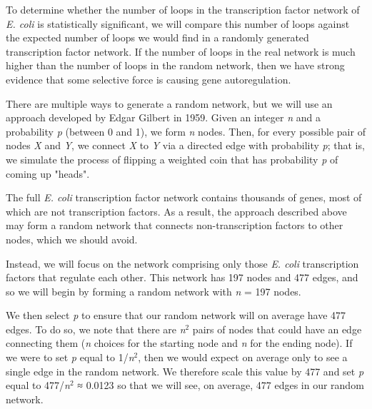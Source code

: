 To determine whether the number of loops in the transcription factor network of \textit{E. coli} is statistically significant, we will compare this number of loops against the expected number of loops we would find in a randomly generated transcription factor network. If the number of loops in the real network is much higher than the number of loops in the random network, then we have strong evidence that some selective force is causing gene autoregulation.

There are multiple ways to generate a random network, but we will use an approach developed by Edgar Gilbert in 1959. Given an integer \textit{n} and a probability \textit{p} (between 0 and 1), we form \textit{n} nodes. Then, for every possible pair of nodes \textit{X} and \textit{Y}, we connect \textit{X} to \textit{Y} via a directed edge with probability \textit{p}; that is, we simulate the process of flipping a weighted coin that has probability \textit{p} of coming up "heads".

\begin{note}\end{note}

\begin{qbox}\end{qbox} 

The full \textit{E. coli} transcription factor network contains thousands of genes, most of which are not transcription factors. As a result, the approach described above may form a random network that connects non-transcription factors to other nodes, which we should avoid.

Instead, we will focus on the network comprising only those \textit{E. coli} transcription factors that regulate each other. This network has 197 nodes and 477 edges, and so we will begin by forming a random network with \textit{n} = 197 nodes.

We then select \textit{p} to ensure that our random network will on average have 477 edges. To do so, we note that there are \textit{n}$^2$ pairs of nodes that could have an edge connecting them (\textit{n} choices for the starting node and \textit{n} for the ending node). If we were to set \textit{p} equal to 1/\textit{n}$^2$, then we would expect on average only to see a single edge in the random network. We therefore scale this value by 477 and set \textit{p} equal to 477/\textit{n}$^2$ ≈ 0.0123 so that we will see, on average, 477 edges in our random network.

